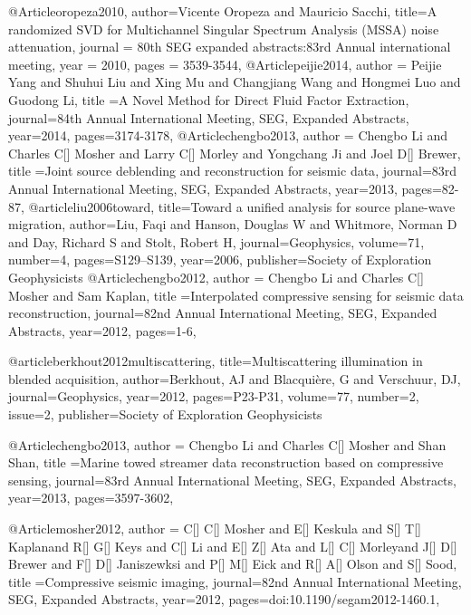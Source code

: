 {@Article{oropeza2010,
  author={Vicente Oropeza and Mauricio Sacchi},
  title={A randomized SVD for Multichannel Singular Spectrum Analysis (MSSA) noise attenuation},
  journal = 	 {80th SEG expanded abstracts:83rd Annual international meeting},
  year = 	 2010,
  pages =	 {3539-3544},
}
@Article{peijie2014,
  author = {Peijie Yang and Shuhui Liu and Xing Mu and Changjiang Wang and Hongmei Luo and Guodong Li},
  title ={A Novel Method for Direct Fluid Factor Extraction},
  journal={84th Annual International Meeting, SEG, Expanded Abstracts},
  year=2014,
  pages={3174-3178},
}
@Article{chengbo2013,
  author = {Chengbo Li and Charles C[] Mosher and Larry C[] Morley and Yongchang Ji and Joel D[] Brewer},
  title ={Joint source deblending and reconstruction for seismic data},
  journal={83rd Annual International Meeting, SEG, Expanded Abstracts},
  year=2013,
  pages={82-87},
}
@article{liu2006toward,
  title={Toward a unified analysis for source plane-wave migration},
  author={Liu, Faqi and Hanson, Douglas W and Whitmore, Norman D and Day, Richard S and Stolt, Robert H},
  journal={Geophysics},
  volume={71},
  number={4},
  pages={S129--S139},
  year={2006},
  publisher={Society of Exploration Geophysicists}
}
@Article{chengbo2012,
  author = {Chengbo Li and Charles C[] Mosher and Sam Kaplan},
  title ={Interpolated compressive sensing for seismic data reconstruction},
  journal={82nd Annual International Meeting, SEG, Expanded Abstracts},
  year=2012,
  pages={1-6},
}

@article{berkhout2012multiscattering,
  title={Multiscattering illumination in blended acquisition},
  author={Berkhout, AJ and Blacqui{\`e}re, G and Verschuur, DJ},
  journal={Geophysics},
  year={2012},
  pages={P23-P31},
  volume=77,
  number=2,
  issue=2,
  publisher={Society of Exploration Geophysicists}
}

@Article{chengbo2013,
  author = {Chengbo Li and Charles C[] Mosher and Shan Shan},
  title ={Marine towed streamer data reconstruction based on compressive sensing},
  journal={83rd Annual International Meeting, SEG, Expanded Abstracts},
  year=2013,
  pages={3597-3602},
}

@Article{mosher2012,
  author = {C[] C[] Mosher and E[] Keskula and S[] T[] Kaplanand R[] G[] Keys and C[] Li and E[] Z[] Ata and L[] C[] Morleyand J[] D[] Brewer and F[] D[] Janiszewksi and P[] M[] Eick and R[] A[] Olson and S[] Sood},
  title ={Compressive seismic imaging},
  journal={82nd Annual International Meeting, SEG, Expanded Abstracts},
  year=2012,
  pages={doi:10.1190/segam2012-1460.1},
}


}
